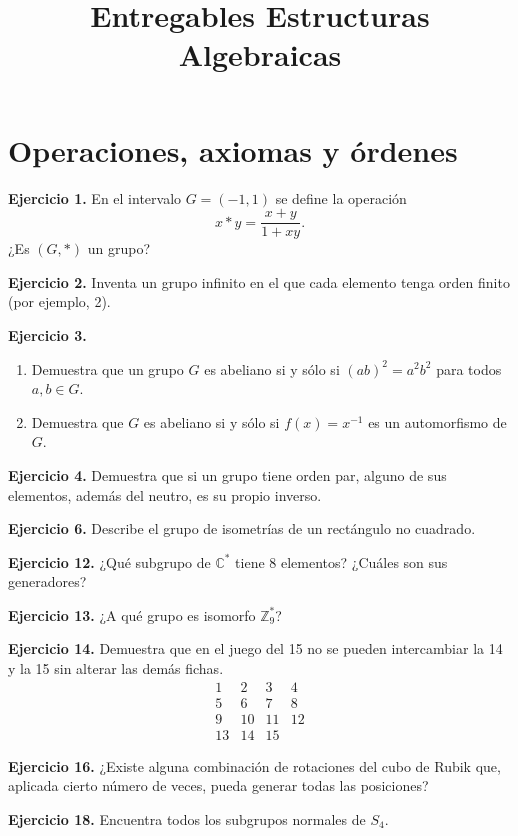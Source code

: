 \documentclass[11pt,a4paper]{article}
\title{Entregables Estructuras Algebraicas}
\author{}
\date{}
\newcommand{\Z}{\mathbb Z}
\newcommand{\C}{\mathbb C}
\newcommand{\ej}[1]{\par\medskip\textbf{Ejercicio #1.}\enspace}
\begin{document}
\maketitle
\section{Operaciones, axiomas y órdenes}
\ej{1} En el intervalo $G=(-1,1)$ se define la operación
\[x*y=\frac{x+y}{1+xy}.\]
¿Es $(G,*)$ un grupo?

\newpage

\ej{2} Inventa un grupo infinito en el que cada elemento tenga orden finito (por ejemplo, 2).

\vspace{5cm}

\ej{3}
\begin{enumerate}[label=(\alph*)]
\item Demuestra que un grupo $G$ es abeliano si y sólo si $(ab)^2=a^2b^2$ para todos $a,b\in G$.
\item Demuestra que $G$ es abeliano si y sólo si $f(x)=x^{-1}$ es un automorfismo de $G$.
\end{enumerate}

\newpage

\ej{4} Demuestra que si un grupo tiene orden par, alguno de sus elementos, además del neutro, es su propio inverso.

\vspace{5cm}

\ej{6} Describe el grupo de isometrías de un rectángulo no cuadrado.

\vspace{5cm}

\ej{12} ¿Qué subgrupo de $\C^*$ tiene 8 elementos? ¿Cuáles son sus generadores?

\vspace{5cm}

\ej{13} ¿A qué grupo es isomorfo $\Z_9^*$?

\newpage

\ej{14} Demuestra que en el juego del 15 no se pueden intercambiar la 14 y la 15 sin alterar las demás fichas.
\[\begin{array}{cccc}1&2&3&4\\5&6&7&8\\9&10&11&12\\13&14&15&\phantom{0}\end{array}\]

\vspace{5cm}

\ej{16} ¿Existe alguna combinación de rotaciones del cubo de Rubik que, aplicada cierto número de veces, pueda generar todas las posiciones?

\vspace{5cm}

\ej{18} Encuentra todos los subgrupos normales de $S_4$.
\end{document}
